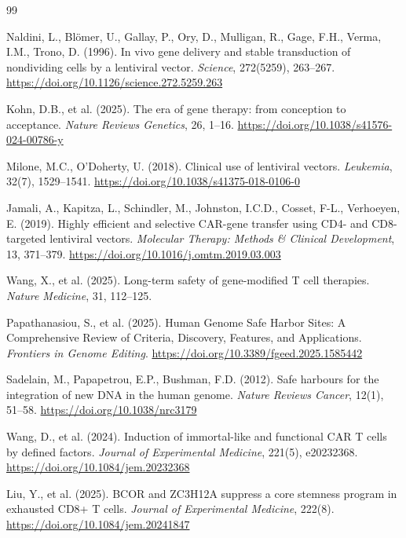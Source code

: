 \documentclass[12pt]{article}
\begin{document}
\begin{thebibliography}{99}

Naldini, L., Blömer, U., Gallay, P., Ory, D., Mulligan, R., Gage, F.H., Verma, I.M., Trono, D. (1996).
In vivo gene delivery and stable transduction of nondividing cells by a lentiviral vector.
\textit{Science}, 272(5259), 263--267.
\url{https://doi.org/10.1126/science.272.5259.263}

Kohn, D.B., et al. (2025).
The era of gene therapy: from conception to acceptance.
\textit{Nature Reviews Genetics}, 26, 1--16.
\url{https://doi.org/10.1038/s41576-024-00786-y}

Milone, M.C., O'Doherty, U. (2018).
Clinical use of lentiviral vectors.
\textit{Leukemia}, 32(7), 1529--1541.
\url{https://doi.org/10.1038/s41375-018-0106-0}

Jamali, A., Kapitza, L., Schindler, M., Johnston, I.C.D., Cosset, F-L., Verhoeyen, E. (2019).
Highly efficient and selective CAR-gene transfer using CD4- and CD8-targeted lentiviral vectors.
\textit{Molecular Therapy: Methods \& Clinical Development}, 13, 371--379.
\url{https://doi.org/10.1016/j.omtm.2019.03.003}

Wang, X., et al. (2025).
Long-term safety of gene-modified T cell therapies.
\textit{Nature Medicine}, 31, 112--125.

Papathanasiou, S., et al. (2025).
Human Genome Safe Harbor Sites: A Comprehensive Review of Criteria, Discovery, Features, and Applications.
\textit{Frontiers in Genome Editing}.
\url{https://doi.org/10.3389/fgeed.2025.1585442}

Sadelain, M., Papapetrou, E.P., Bushman, F.D. (2012).
Safe harbours for the integration of new DNA in the human genome.
\textit{Nature Reviews Cancer}, 12(1), 51--58.
\url{https://doi.org/10.1038/nrc3179}

Wang, D., et al. (2024).
Induction of immortal-like and functional CAR T cells by defined factors.
\textit{Journal of Experimental Medicine}, 221(5), e20232368.
\url{https://doi.org/10.1084/jem.20232368}

Liu, Y., et al. (2025).
BCOR and ZC3H12A suppress a core stemness program in exhausted CD8+ T cells.
\textit{Journal of Experimental Medicine}, 222(8).
\url{https://doi.org/10.1084/jem.20241847}


\end{thebibliography}
\end{document}
